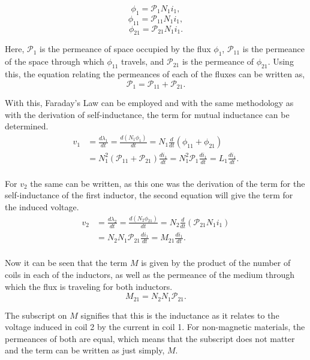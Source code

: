 \documentclass[12pt]{article}
\begin{document}
    \[
        \phi_1 = \mathcal{P}_1 N_1 i_1,
    \]
    \[
        \phi_{11} = \mathcal{P}_{11} N_1 i_1,
    \]
    \[
        \phi_{21} = \mathcal{P}_{21} N_1 i_1.
    \]
    \par Here, $\mathcal{P}_1$ is the permeance of space occupied by the flux
    $\phi_1$, $\mathcal{P}_{11}$ is the permeance of the space through which
    $\phi_{11}$ travels, and $\mathcal{P}_{21}$ is the permeance of $\phi_{21}$.
    Using this, the equation relating the permeances of each of the fluxes can
    be written as,
    \[
        \mathcal{P}_1 = \mathcal{P}_{11} + \mathcal{P}_{21}
    .\]
    \par With this, Faraday's Law can be employed and with the same methodology
    as with the derivation of self-inductance, the term for mutual inductance
    can be determined.
    \begin{align*}
        v_1 &= \frac{d\lambda_1}{dt} = \frac{d(N_1\phi_1)}{dt} = N_1
            \frac{d}{dt}(\phi_{11} + \phi_{21}) \\
            &= N_1^2(\mathcal{P}_{11} + \mathcal{P}_{21}) \frac{di_1}{dt} =
            N_1^2 \mathcal{P}_1 \frac{di_1}{dt} = L_1 \frac{di_1}{dt}. \\
    \end{align*}
    \par For $v_2$ the same can be written, as this one was the derivation of
    the term for the self-inductance of the first inductor, the second equation
    will give the term for the induced voltage.
    \begin{align*}
        v_2 &= \frac{d\lambda_2}{dt} = \frac{d(N_2\phi_{21})}{dt} = N_2
            \frac{d}{dt} (\mathcal{P}_{21}N_1i_1) \\
            &= N_2 N_1 \mathcal{P}_{21} \frac{di_1}{dt} = M_{21}
            \frac{di_1}{dt}. \\
    \end{align*}
    \par Now it can be seen that the term $M$ is given by the product of the
    number of coils in each of the inductors, as well as the permeance of the
    medium through which the flux is traveling for both inductors.
    \[
        M_{21} = N_2 N_1 \mathcal{P}_{21}.
    \]
    \par The subscript on $M$ signifies that this is the inductance as it
    relates to the voltage induced in coil 2 by the current in coil 1. For
    non-magnetic materials, the permeances of both are equal, which means that
    the subscript does not matter and the term can be written as just simply,
    $M$.
\end{document}
